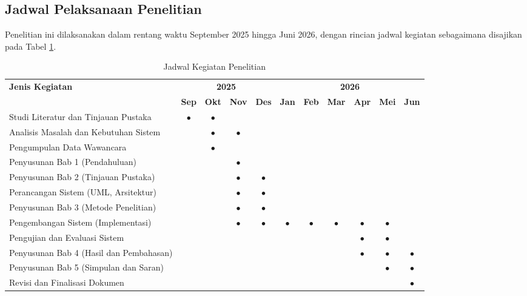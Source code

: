 \subsection{Jadwal Pelaksanaan Penelitian}\label{jadwal-pelaksanaan-penelitian}

Penelitian ini dilaksanakan dalam rentang waktu September 2025 hingga Juni 2026, dengan rincian jadwal kegiatan sebagaimana disajikan pada Tabel \ref{tab:jadwal_kegiatan}.

\begin{table}[H]
\centering
\caption{Jadwal Kegiatan Penelitian}
\label{tab:jadwal_kegiatan}
\vspace{0.3cm}

\small
\setlength{\tabcolsep}{4pt}

\begin{tabular}{|p{4.8cm}|c|c|c|c|c|c|c|c|c|c|}
\hline
\textbf{Jenis Kegiatan} & \multicolumn{4}{c|}{\textbf{2025}} & \multicolumn{6}{c|}{\textbf{2026}} \\ \cline{2-11}
 & \textbf{Sep} & \textbf{Okt} & \textbf{Nov} & \textbf{Des} & \textbf{Jan} & \textbf{Feb} & \textbf{Mar} & \textbf{Apr} & \textbf{Mei} & \textbf{Jun} \\ \hline

Studi Literatur dan Tinjauan Pustaka & $\bullet$ & $\bullet$ & & & & & & & & \\ \hline
Analisis Masalah dan Kebutuhan Sistem & & $\bullet$ & $\bullet$ & & & & & & & \\ \hline
Pengumpulan Data Wawancara & & $\bullet$ & & & & & & & & \\ \hline
Penyusunan Bab 1 (Pendahuluan) & & & $\bullet$ & & & & & & & \\ \hline
Penyusunan Bab 2 (Tinjauan Pustaka) & & & $\bullet$ & $\bullet$ & & & & & & \\ \hline
Perancangan Sistem (UML, Arsitektur) & & & $\bullet$ & $\bullet$ & & & & & & \\ \hline
Penyusunan Bab 3 (Metode Penelitian) & & & $\bullet$ & $\bullet$ & & & & & & \\ \hline
Pengembangan Sistem (Implementasi) & & & $\bullet$ & $\bullet$ & $\bullet$ & $\bullet$ & $\bullet$ & $\bullet$ & $\bullet$ & \\ \hline
Pengujian dan Evaluasi Sistem & & & & & & & & $\bullet$ & $\bullet$ & \\ \hline
Penyusunan Bab 4 (Hasil dan Pembahasan) & & & & & & & & $\bullet$ & $\bullet$ & $\bullet$ \\ \hline
Penyusunan Bab 5 (Simpulan dan Saran) & & & & & & & & & $\bullet$ & $\bullet$ \\ \hline
Revisi dan Finalisasi Dokumen & & & & & & & & & & $\bullet$ \\ \hline

\end{tabular}
\end{table}


